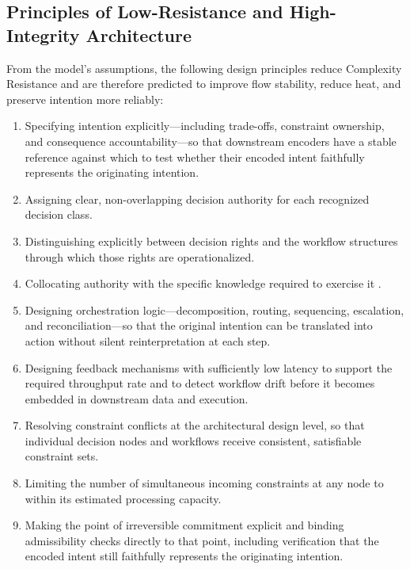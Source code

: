 \documentclass[12pt]{article}
\begin{document}
\subsection{Principles of Low-Resistance and High-Integrity Architecture}
\label{sec:principles}

From the model's assumptions, the following design principles reduce
Complexity Resistance and are therefore predicted to improve flow stability,
reduce heat, and preserve intention more reliably:

\begin{enumerate}
  \item Specifying intention explicitly---including trade-offs, constraint
    ownership, and consequence accountability---so that downstream encoders
    have a stable reference against which to test whether their encoded intent
    faithfully represents the originating intention.
  \item Assigning clear, non-overlapping decision authority for each
    recognized decision class.
  \item Distinguishing explicitly between decision rights and the workflow
    structures through which those rights are operationalized.
  \item Collocating authority with the specific knowledge required to
    exercise it \citep{jensen1992specific}.
  \item Designing orchestration logic---decomposition, routing, sequencing,
    escalation, and reconciliation---so that the original intention can be
    translated into action without silent reinterpretation at each step.
  \item Designing feedback mechanisms with sufficiently low latency to
    support the required throughput rate and to detect workflow drift before
    it becomes embedded in downstream data and execution.
  \item Resolving constraint conflicts at the architectural design level, so
    that individual decision nodes and workflows receive consistent,
    satisfiable constraint sets.
  \item Limiting the number of simultaneous incoming constraints at any node
    to within its estimated processing capacity.
  \item Making the point of irreversible commitment explicit and binding
    admissibility checks directly to that point, including verification that
    the encoded intent still faithfully represents the originating intention.
\end{enumerate}
\end{document}
